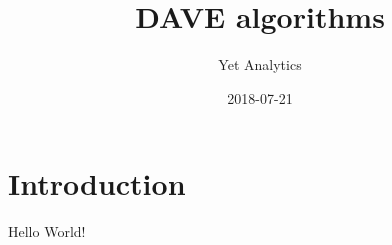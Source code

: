 \documentclass{article}
\title{DAVE algorithms}
\date{2018-07-21}
\author{Yet Analytics}
\begin{document}
\maketitle
\newpage
{}
\section*{Introduction}

Hello World!
\end{document}
